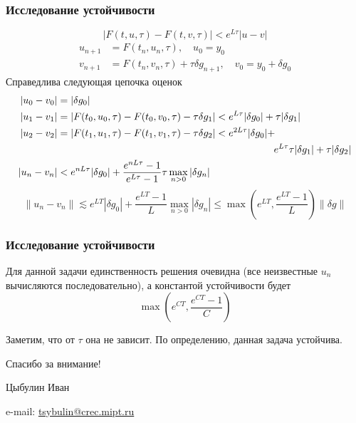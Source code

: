 \documentclass[apectratio=43,unicode]{beamer}
\newcommand{\colorhref}[2]{\href{#1}{\textcolor{miptbase!30!black}{#2}}}
\begin{document}
\begin{frame}\frametitle{Исследование устойчивости}
	$$
	|F(t,u,\tau)-F(t,v,\tau)| < e^{L\tau} |u-v|
	$$
	\begin{align*}
	u_{n+1} &= F(t_n, u_n, \tau), \quad u_0 = y_0\\
	v_{n+1} &= F(t_n, v_n, \tau) + \tau \delta g_{n+1}, \quad v_0 = y_0 + \delta g_0
	\end{align*}
	Справедлива следующая цепочка оценок
	\begin{align*}
	|u_0 - v_0| &= |\delta g_0|\\
	|u_1 - v_1| &= |F(t_0, u_0, \tau)-F(t_0, v_0, \tau) - \tau \delta g_1| < 
		e^{L\tau} |\delta g_0| + \tau |\delta g_1|\\
	|u_2 - v_2| &= |F(t_1, u_1, \tau)-F(t_1, v_1, \tau) - \tau \delta g_2| < 
		e^{2L\tau} |\delta g_0| + \\
				& \hspace{.63\textwidth} e^{L\tau} \tau |\delta g_1| + \tau |\delta g_2|\\
	|u_n - v_n| &< e^{n L\tau}|\delta g_0| + \frac{e^{n L\tau}-1}{e^{L\tau}-1}\tau\max_{n>0} |\delta g_n|
	\end{align*}
	$$\|u_n - v_n\| \lesssim e^{LT} |\delta g_0| + \frac{e^{LT}-1}{L} \max_{n>0} |\delta g_n| \leq
	\max\left(e^{LT}, \frac{e^{LT}-1}{L}\right) \|\delta g\|$$
\end{frame}

\begin{frame}\frametitle{Исследование устойчивости}
	Для данной задачи единственность решения очевидна (все неизвестные $u_n$ вычисляются последовательно), 
	а константой устойчивости будет
	$$
	\max\left(e^{CT}, \frac{e^{CT}-1}{C}\right)
	$$

	Заметим, что от $\tau$ она не зависит. По определению, данная задача устойчива.
\end{frame}

\begin{frame}[plain]
  \begin{center}
  {\Huge Спасибо за внимание!}
  \vspace{8ex}

  Цыбулин Иван

  e-mail: \colorhref{mailto:tsybulin@crec.mipt.ru}{tsybulin@crec.mipt.ru}
  \end{center}
\end{frame}
\end{document}
